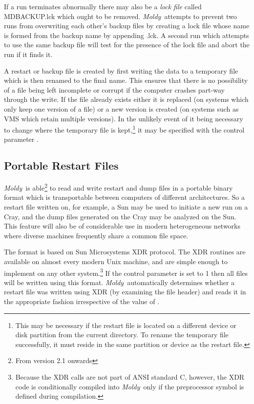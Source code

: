 \documentclass[a4paper,twoside]{report}
\newcommand{\Fname}[1]{{\upshape\mdseries\sffamily#1}}
\newcommand{\moldy}{\emph{Moldy}}
\begin{document}
If a run terminates abnormally there may also be a \emph{lock file}
called \Fname{MDBACKUP.lck} which ought to be removed.  \moldy\
attempts to prevent two runs from overwriting each other's backup
files by creating a lock file whose name is formed from the backup
name by appending \Fname{.lck}.  A second run which attempts to use the
same backup file will test for the presence of the lock file and abort
the run if it finds it.

A restart or backup file is created by first writing the data to a
temporary file which is then renamed to the final name.  This ensures
that there is no possibility of a file being left incomplete or
corrupt if the computer crashes part-way through the write.  If the
file already exists either it is replaced (on systems which only keep
one version of a file) or a new version is created (on systems such as
VMS which retain multiple versions).  In the unlikely event of it
being necessary to change where the temporary file is
kept,\footnote{This may be necessary if the restart file is located on
  a different device or disk partition from the current directory. To
  rename the temporary file successfully, it must reside in the same
  partition or device as the restart file.} it may be specified with
the control parameter \Lit{temp-file}.

\subsection{Portable Restart Files}
\label{sec:xdr}
\moldy\ is able\footnote{From version 2.1 onwards} to read and write
restart and dump files in a portable binary format which is
transportable between computers of different architectures.  So a
restart file written on, for example, a Sun may be used to initiate a
new run on a Cray, and the dump files generated on the Cray may be
analyzed on the Sun.  This feature will also be of considerable use in
modern heterogeneous networks where diverse machines frequently share
a common file space.

The format is based on Sun Microsystems XDR protocol\cite{sunxdr}.
The XDR routines are available on almost every modern Unix machine,
and are simple enough to implement on any other
system.\footnote{Because the XDR calls are not part of ANSI standard
  C, however, the XDR code is conditionally compiled into \moldy\ only
  if the \Lit{USE\_XDR} preprocessor symbol is defined during
  compilation.} If the control parameter  is set to 1 then
all files will be written using this format. \moldy\ automatically
determines whether a restart file was written using XDR (by examining
the file header) and reads it in the appropriate fashion irrespective
of the value of \Lit{xdr}.
\end{document}
